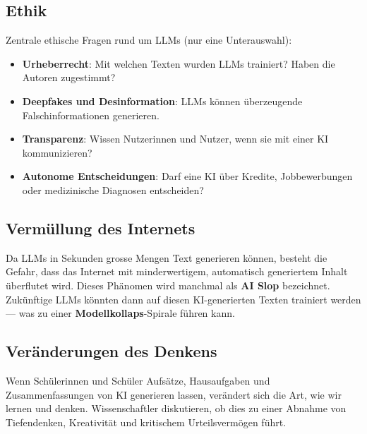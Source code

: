 \subsection{Ethik}

\begin{mysummary}
    Zentrale ethische Fragen rund um LLMs (nur eine Unterauswahl):
    \begin{itemize}
        \item \textbf{Urheberrecht}: Mit welchen Texten wurden LLMs trainiert?
              Haben die Autoren zugestimmt?
        \item \textbf{Deepfakes und Desinformation}: LLMs können überzeugende
              Falschinformationen generieren.
        \item \textbf{Transparenz}: Wissen Nutzerinnen und Nutzer, wenn sie mit
              einer KI kommunizieren?
        \item \textbf{Autonome Entscheidungen}: Darf eine KI über Kredite, Jobbewerbungen
              oder medizinische Diagnosen entscheiden?
    \end{itemize}
\end{mysummary}

\subsection{Vermüllung des Internets}

\begin{mydefinition}
    Da LLMs in Sekunden grosse Mengen Text generieren können, besteht die Gefahr,
    dass das Internet mit minderwertigem, automatisch generiertem Inhalt überflutet wird.
    Dieses Phänomen wird manchmal als \textbf{AI Slop} bezeichnet.
    Zukünftige LLMs könnten dann auf diesen KI-generierten Texten trainiert werden ---
    was zu einer \textbf{Modellkollaps}-Spirale führen kann.
\end{mydefinition}

\subsection{Veränderungen des Denkens}

\begin{myremark}
    Wenn Schülerinnen und Schüler Aufsätze, Hausaufgaben und Zusammenfassungen
    von KI generieren lassen, verändert sich die Art, wie wir lernen und denken.
    Wissenschaftler diskutieren, ob dies zu einer Abnahme von Tiefendenken,
    Kreativität und kritischem Urteilsvermögen führt.
\end{myremark}

